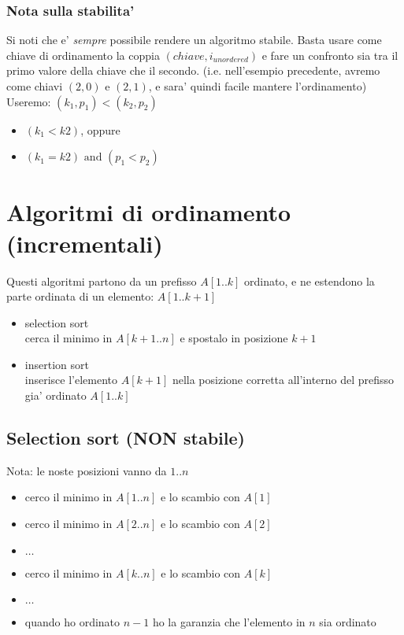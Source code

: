 \documentclass{article}
\begin{document}
\subsubsection{Nota sulla stabilita'}

Si noti che e' \emph{sempre} possibile rendere un algoritmo stabile. Basta usare
come chiave di ordinamento la coppia $(chiave, i_{unordered})$ e fare un confronto
sia tra il primo valore della chiave che il secondo. (i.e. nell'esempio precedente,
avremo come chiavi $(2, 0)$ e $(2, 1)$, e sara' quindi facile mantere l'ordinamento)
Useremo: $(k_1, p_1) < (k_2, p_2)$
\begin{itemize}
  \item $(k_1 < k2)$, oppure
  \item $(k_1 = k2) \text{  and  } (p_1 < p_2)$
\end{itemize}

\section{Algoritmi di ordinamento (incrementali)}
Questi algoritmi partono da un prefisso $A[1..k]$ ordinato, e ne estendono la
parte ordinata di un elemento: $A[1..k+1]$
\begin{itemize}
  \item selection sort \\
    cerca il minimo in $A[k+1..n]$ e spostalo in posizione $k+1$
  \item insertion sort \\
    inserisce l'elemento $A[k+1]$ nella posizione corretta all'interno del
    prefisso gia' ordinato $A[1..k]$
\end{itemize}

\subsection{Selection sort (NON stabile)}

Nota: le noste posizioni vanno da $1..n$
\begin{itemize}
  \item cerco il minimo in $A[1..n]$ e lo scambio con $A[1]$
  \item cerco il minimo in $A[2..n]$ e lo scambio con $A[2]$
  \item $\ldots$
  \item cerco il minimo in $A[k..n]$ e lo scambio con $A[k]$
  \item $\ldots$
  \item quando ho ordinato $n-1$ ho la garanzia che l'elemento in $n$ sia ordinato
\end{itemize}
\end{document}
